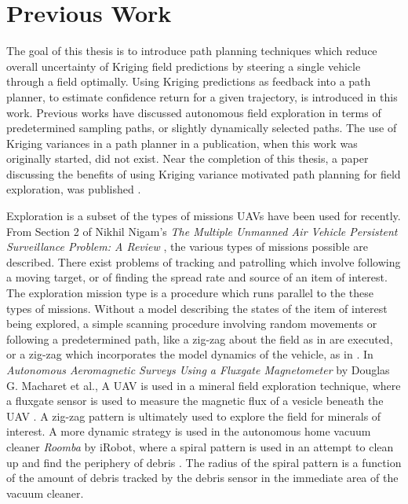 \section{Previous Work}
The goal of this thesis is to introduce path planning techniques which reduce overall uncertainty of Kriging field predictions by steering a single vehicle through a field optimally. Using Kriging predictions as feedback into a path planner, to estimate confidence return for a given trajectory, is introduced in this work. Previous works have discussed autonomous field exploration in terms of predetermined sampling paths, or slightly dynamically selected paths. The use of Kriging variances in a path planner in a publication, when this work was originally started, did not exist. Near the completion of this thesis, a paper discussing the benefits of using Kriging variance motivated path planning for field exploration, was published \cite{fentanes:soilkrig}.

Exploration is a subset of the types of missions UAVs have been used for recently. From Section 2 of Nikhil Nigam's \textit{The Multiple Unmanned Air Vehicle Persistent Surveillance Problem: A Review} \cite{nigam:missions}, the various types of missions possible are described. There exist problems of tracking and patrolling which involve following a moving target, or of finding the spread rate and source of an item of interest. The exploration mission type is a procedure which runs parallel to the these types of missions. Without a model describing the states of the item of interest being explored, a simple scanning procedure involving random movements or following a predetermined path, like a zig-zag about the field as in \cite{semsch:uav_zig} are executed, or a zig-zag which incorporates the model dynamics of the vehicle, as in \cite{nigam:zigzag}. In \textit{Autonomous Aeromagnetic Surveys Using a Fluxgate Magnetometer} by Douglas G. Macharet et al., A UAV is used in a mineral field exploration technique, where a fluxgate sensor is used to measure the magnetic flux of a vesicle beneath the UAV \cite{macharet:magnet}. A zig-zag pattern is ultimately used to explore the field for minerals of interest. A more dynamic strategy is used in the autonomous home vacuum cleaner \textit{Roomba} by iRobot, where a spiral pattern is used in an attempt to clean up and find the periphery of debris \cite{roomba:spiral}. The radius of the spiral pattern is a function of the amount of debris tracked by the debris sensor in the immediate area of the vacuum cleaner.


